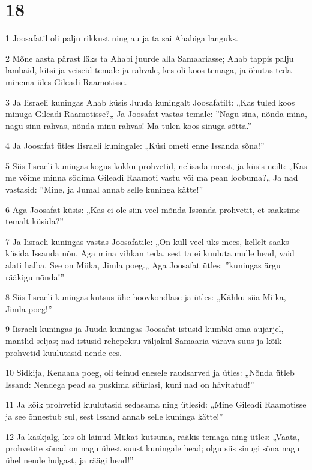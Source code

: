 \chapter{18}

\par 1 Joosafatil oli palju rikkust ning au ja ta sai Ahabiga languks.
\par 2 Mõne aasta pärast läks ta Ahabi juurde alla Samaariasse; Ahab tappis palju lambaid, kitsi ja veiseid temale ja rahvale, kes oli koos temaga, ja õhutas teda minema üles Gileadi Raamotisse.
\par 3 Ja Iisraeli kuningas Ahab küsis Juuda kuningalt Joosafatilt: „Kas tuled koos minuga Gileadi Raamotisse?„ Ja Joosafat vastas temale: ”Nagu sina, nõnda mina, nagu sinu rahvas, nõnda minu rahvas! Ma tulen koos sinuga sõtta.”
\par 4 Ja Joosafat ütles Iisraeli kuningale: „Küsi ometi enne Issanda sõna!”
\par 5 Siis Iisraeli kuningas kogus kokku prohvetid, nelisada meest, ja küsis neilt: „Kas me võime minna sõdima Gileadi Raamoti vastu või ma pean loobuma?„ Ja nad vastasid: ”Mine, ja Jumal annab selle kuninga kätte!”
\par 6 Aga Joosafat küsis: „Kas ei ole siin veel mõnda Issanda prohvetit, et saaksime temalt küsida?”
\par 7 Ja Iisraeli kuningas vastas Joosafatile: „On küll veel üks mees, kellelt saaks küsida Issanda nõu. Aga mina vihkan teda, sest ta ei kuuluta mulle head, vaid alati halba. See on Miika, Jimla poeg.„ Aga Joosafat ütles: ”kuningas ärgu rääkigu nõnda!”
\par 8 Siis Iisraeli kuningas kutsus ühe hoovkondlase ja ütles: „Kähku siia Miika, Jimla poeg!”
\par 9 Iisraeli kuningas ja Juuda kuningas Joosafat istusid kumbki oma aujärjel, mantlid seljas; nad istusid rehepeksu väljakul Samaaria värava suus ja kõik prohvetid kuulutasid nende ees.
\par 10 Sidkija, Kenaana poeg, oli teinud enesele raudsarved ja ütles: „Nõnda ütleb Issand: Nendega pead sa puskima süürlasi, kuni nad on hävitatud!”
\par 11 Ja kõik prohvetid kuulutasid sedasama ning ütlesid: „Mine Gileadi Raamotisse ja see õnnestub sul, sest Issand annab selle kuninga kätte!”
\par 12 Ja käskjalg, kes oli läinud Miikat kutsuma, rääkis temaga ning ütles: „Vaata, prohvetite sõnad on nagu ühest suust kuningale head; olgu siis sinugi sõna nagu ühel nende hulgast, ja räägi head!”
